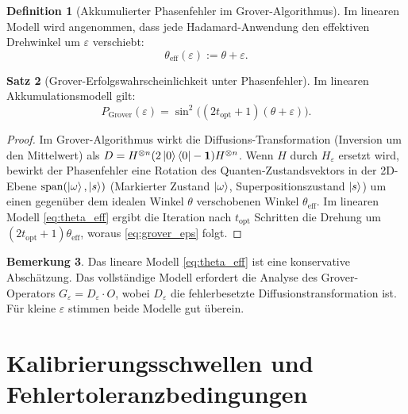 ﻿\documentclass[11pt,a4paper]{article}
\theoremstyle{definition}
\newtheorem{theorem}{Satz}[section]
\newtheorem{definition}[theorem]{Definition}
\newtheorem{remark}[theorem]{Bemerkung}
\newcommand{\eps}{\varepsilon}
\newcommand{\Heps}{H_{\!\varepsilon}}
\begin{document}
\begin{definition}[Akkumulierter Phasenfehler im Grover-Algorithmus]
  Im linearen Modell wird angenommen, dass jede Hadamard-Anwendung den
  effektiven Drehwinkel um $\eps$ verschiebt:
  \begin{equation}
    \theta_{\mathrm{eff}}(\eps) := \theta + \eps.
    \label{eq:theta_eff}
  \end{equation}
\end{definition}

\begin{theorem}[Grover-Erfolgswahrscheinlichkeit unter Phasenfehler]
\label{thm:grover}
  Im linearen Akkumulationsmodell gilt:
  \begin{equation}
    P_{\mathrm{Grover}}(\eps) = \sin^2\bigl((2t_{\mathrm{opt}}+1)(\theta+\eps)\bigr).
    \label{eq:grover_eps}
  \end{equation}
\end{theorem}

\begin{proof}
  Im Grover-Algorithmus wirkt die Diffusions-Transformation (Inversion um den
  Mittelwert) als $D = H^{\otimes n}(2\ket{0}\bra{0}-\mathbf{1})H^{\otimes n}$.
  Wenn $H$ durch $\Heps$ ersetzt wird, bewirkt der Phasenfehler eine Rotation
  des Quanten-Zustandsvektors in der 2D-Ebene $\mathrm{span}(\ket{\omega},\ket{s})$
  (Markierter Zustand $\ket{\omega}$, Superpositionszustand $\ket{s}$) um einen
  gegenüber dem idealen Winkel $\theta$ verschobenen Winkel $\theta_{\mathrm{eff}}$.
  Im linearen Modell \eqref{eq:theta_eff} ergibt die Iteration nach $t_{\mathrm{opt}}$
  Schritten die Drehung um $(2t_{\mathrm{opt}}+1)\theta_{\mathrm{eff}}$, woraus
  \eqref{eq:grover_eps} folgt.
\end{proof}

\begin{remark}
  Das lineare Modell \eqref{eq:theta_eff} ist eine konservative Abschätzung.
  Das vollständige Modell erfordert die Analyse des Grover-Operators
  $G_\eps = D_\eps \cdot O$, wobei $D_\eps$ die fehlerbesetzte
  Diffusionstransformation ist.  Für kleine $\eps$ stimmen beide Modelle
  gut überein.
\end{remark}

\section{Kalibrierungsschwellen und Fehlertoleranzbedingungen}
\label{sec:threshold}
\end{document}
